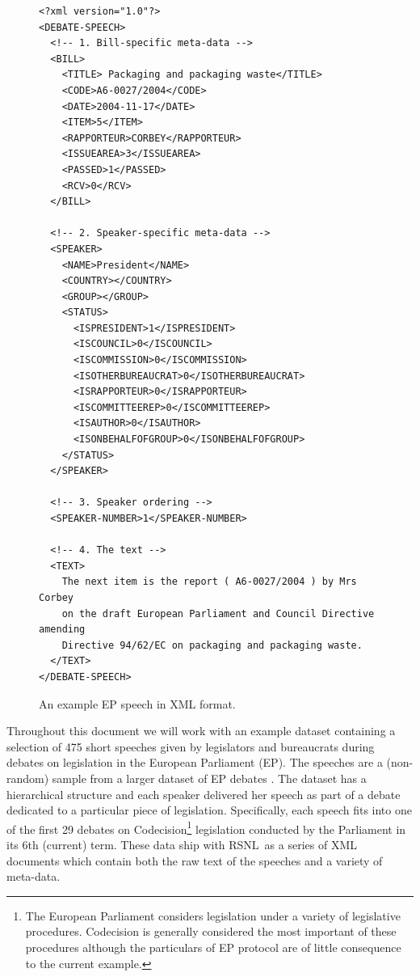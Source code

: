 \documentclass[11pt]{article}
\def\RSNL{{\normalfont\fontseries{b}\selectfont RSNL}}
\begin{document}
\begin{figure}
\begin{center}
\begin{verbatim}
<?xml version="1.0"?>
<DEBATE-SPEECH>
  <!-- 1. Bill-specific meta-data -->
  <BILL>
    <TITLE> Packaging and packaging waste</TITLE>
    <CODE>A6-0027/2004</CODE>
    <DATE>2004-11-17</DATE>
    <ITEM>5</ITEM>
    <RAPPORTEUR>CORBEY</RAPPORTEUR>
    <ISSUEAREA>3</ISSUEAREA>
    <PASSED>1</PASSED>
    <RCV>0</RCV>
  </BILL>

  <!-- 2. Speaker-specific meta-data -->
  <SPEAKER>
    <NAME>President</NAME>
    <COUNTRY></COUNTRY>
    <GROUP></GROUP>
    <STATUS>
      <ISPRESIDENT>1</ISPRESIDENT>
      <ISCOUNCIL>0</ISCOUNCIL>
      <ISCOMMISSION>0</ISCOMMISSION>
      <ISOTHERBUREAUCRAT>0</ISOTHERBUREAUCRAT>
      <ISRAPPORTEUR>0</ISRAPPORTEUR>
      <ISCOMMITTEEREP>0</ISCOMMITTEEREP>
      <ISAUTHOR>0</ISAUTHOR>
      <ISONBEHALFOFGROUP>0</ISONBEHALFOFGROUP>
    </STATUS>
  </SPEAKER>

  <!-- 3. Speaker ordering -->
  <SPEAKER-NUMBER>1</SPEAKER-NUMBER>

  <!-- 4. The text -->
  <TEXT>
    The next item is the report ( A6-0027/2004 ) by Mrs Corbey
    on the draft European Parliament and Council Directive amending
    Directive 94/62/EC on packaging and packaging waste.
  </TEXT>
</DEBATE-SPEECH>
\end{verbatim}
\caption{An example EP speech in XML format.}
\label{fig:xml}
\end{center}
\end{figure}

Throughout this document we will work with an example dataset
containing a selection of 475 short speeches given by legislators and
bureaucrats during debates on legislation in the European Parliament
(EP).  The speeches are a (non-random) sample from a larger dataset of
EP debates \cite{rcv}.  The dataset has a
hierarchical structure and each speaker delivered her speech as part
of a debate dedicated to a particular piece of legislation.
Specifically, each speech fits into one of the first 29 debates on
Codecision\footnote{The European Parliament considers legislation
under a variety of legislative procedures.  Codecision is generally
considered the most important of these procedures although the
particulars of EP protocol are of little consequence to the current
example.} legislation conducted by the Parliament in its 6th (current)
term.  These data ship with \RSNL\ as a series of XML documents which
contain both the raw text of the speeches and a variety of meta-data.
\end{document}
